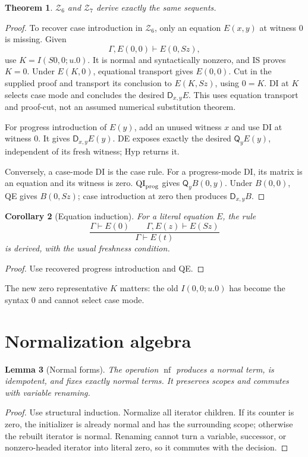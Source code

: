 \documentclass[11pt]{article}
\newtheorem{theorem}{Theorem}[section]
\newtheorem{lemma}[theorem]{Lemma}
\newtheorem{corollary}[theorem]{Corollary}
\newcommand{\Zsix}{\mathcal Z_6}
\newcommand{\Zseven}{\mathcal Z_7}
\newcommand{\Q}{\mathsf Q}\newcommand{\D}{\mathsf D}
\newcommand{\nf}{\operatorname{nf}}\newcommand{\It}{\widehat I}
\begin{document}
\begin{theorem}\label{thm:sixseven}
\(\Zsix\) and \(\Zseven\) derive exactly the same sequents.
\end{theorem}
\begin{proof}
To recover case introduction in \(\Zsix\), only an equation \(E(x,y)\)
at witness \(0\) is missing. Given
\[
                  \Gamma,E(0,0)\vdash E(0,Sz),
\]
use \(K=I(S0,0;u.0)\). It is normal and syntactically nonzero, and
IS proves \(K=0\). Under \(E(K,0)\), equational transport gives
\(E(0,0)\). Cut in the supplied proof and transport its conclusion
to \(E(K,Sz)\), using \(0=K\). DI at \(K\) selects case mode and
concludes the desired \(\D_{x,y}E\).
This uses equation transport and proof-cut, not an assumed numerical
substitution theorem.

For progress introduction of \(E(y)\), add an unused witness \(x\)
and use DI at witness \(0\). It gives \(\D_{x,y}E(y)\).
DE exposes exactly the desired \(\Q_yE(y)\), independent of its
fresh witness; Hyp returns it.

Conversely, a case-mode DI is the case rule. For a progress-mode DI,
its matrix is an equation and its witness is zero.
\(\mathrm{QI}_{\rm prog}\) gives \(\Q_y B(0,y)\).
Under \(B(0,0)\), QE gives \(B(0,Sz)\); case introduction at zero
then produces \(\D_{x,y}B\).
\end{proof}

\begin{corollary}[Equation induction]\label{cor:ind}
For a literal equation \(E\), the rule
\[
 \frac{\Gamma\vdash E(0)\qquad\Gamma,E(z)\vdash E(Sz)}
      {\Gamma\vdash E(t)}
\]
is derived, with the usual freshness condition.
\end{corollary}
\begin{proof}
Use recovered progress introduction and QE.
\end{proof}
The new zero representative \(K\) matters: the old
\(I(0,0;u.0)\) has become the syntax \(0\) and cannot select case mode.

\section{Normalization algebra}\label{sec:nfalgebra}
\begin{lemma}[Normal forms]\label{lem:nf}
The operation \(\nf\) produces a normal term, is idempotent, and fixes
exactly normal terms. It preserves scopes and commutes with variable
renaming.
\end{lemma}
\begin{proof}
Use structural induction. Normalize all iterator children. If its
counter is zero, the initializer is already normal and has the
surrounding scope; otherwise the rebuilt iterator is normal.
Renaming cannot turn a variable, successor, or nonzero-headed iterator
into literal zero, so it commutes with the decision.
\end{proof}
\end{document}
